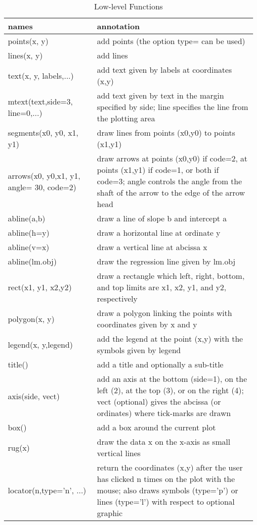 \documentclass[]{book}
\theoremstyle{definition}
\theoremstyle{definition}
\theoremstyle{definition}
\theoremstyle{remark}
\begin{document}
\begin{table}

\caption{\label{tab:unnamed-chunk-110}Low-level Functions}
\centering
\begin{tabular}[t]{l|l}
\hline
names & annotation\\
\hline
points(x, y) & add points (the option type= can be used)\\
\hline
lines(x, y) & add lines\\
\hline
text(x, y, labels,...) & add text given by labels at coordinates (x,y)\\
\hline
mtext(text,side=3, line=0,...) & add text given by text in the margin specified by side; line specifies the line from the plotting area\\
\hline
segments(x0, y0, x1, y1) & draw lines from points (x0,y0) to points (x1,y1)\\
\hline
arrows(x0, y0,x1, y1, angle= 30, code=2) & draw arrows at points (x0,y0) if code=2, at points (x1,y1) if code=1, or both if code=3; angle controls the angle from the shaft of the arrow to the edge of the arrow head\\
\hline
abline(a,b) & draw a line of slope b and intercept a\\
\hline
abline(h=y) & draw a horizontal line at ordinate y\\
\hline
abline(v=x) & draw a vertical line at abcissa x\\
\hline
abline(lm.obj) & draw the regression line given by lm.obj\\
\hline
rect(x1, y1, x2,y2) & draw a rectangle which left, right, bottom, and top limits are x1, x2, y1, and y2, respectively\\
\hline
polygon(x, y) & draw a polygon linking the points with coordinates given by x and y\\
\hline
legend(x, y,legend) & add the legend at the point (x,y) with the symbols given by legend\\
\hline
title() & add a title and optionally a sub-title\\
\hline
axis(side, vect) & add an axis at the bottom (side=1), on the left (2), at the top (3), or on the right (4); vect (optional) gives the abcissa (or ordinates) where tick-marks are drawn\\
\hline
box() & add a box around the current plot\\
\hline
rug(x) & draw the data x on the x-axis as small vertical lines\\
\hline
locator(n,type='n', ...) & return the coordinates (x,y) after the user has clicked n times on the plot with the mouse; also draws symbols (type='p') or lines (type='l') with respect to optional graphic\\
\hline
\end{tabular}
\end{table}
\end{document}
